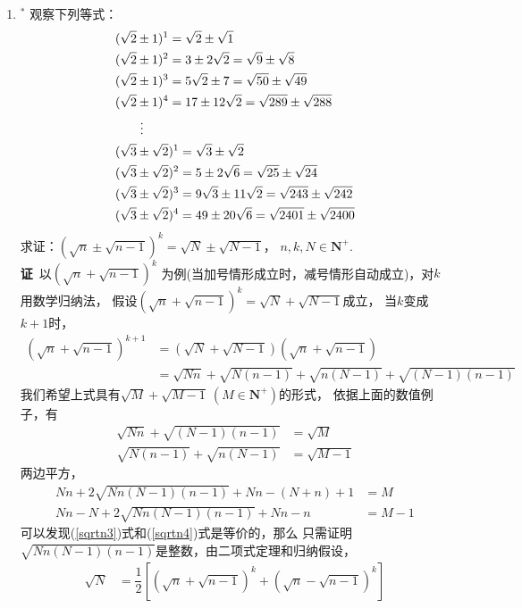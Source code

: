 \begin{enumerate}[label={【\textbf{例\thechapter.\arabic*}】},
 leftmargin=\inteval{\myenumleftmargin}pt,
 itemsep=\inteval{\myenumitempsep}pt,
 itemindent=\inteval{\myenumitemindent}pt]
\item $^*$ 观察下列等式：
\begin{align*}
    &(\sqrt{2} \pm 1)^{1}=\sqrt{2} \pm \sqrt{1} \\
    &(\sqrt{2} \pm 1)^{2}=3 \pm 2\sqrt{2}=\sqrt{9} \pm \sqrt{8} \\
    &(\sqrt{2} \pm 1)^{3}=5\sqrt{2} \pm 7=\sqrt{50} \pm \sqrt{49} \\
    &(\sqrt{2} \pm 1)^{4}=17 \pm 12\sqrt{2}=\sqrt{289} \pm \sqrt{288} \\
    & \quad\quad \vdots \\
    &(\sqrt{3} \pm \sqrt{2})^{1}=\sqrt{3} \pm \sqrt{2} \\
    &(\sqrt{3} \pm \sqrt{2})^{2}=5 \pm 2\sqrt{6}=\sqrt{25} \pm \sqrt{24} \\
    &(\sqrt{3} \pm \sqrt{2})^{3}=9\sqrt{3} \pm 11\sqrt{2}=\sqrt{243} \pm 
    \sqrt{242} \\
    &(\sqrt{3} \pm \sqrt{2})^{4}=49 \pm 20\sqrt{6}=\sqrt{2401} \pm \sqrt{2400}    
\end{align*}
求证：$ (\sqrt{n}\pm\sqrt{n-1})^k=\sqrt{N}\pm\sqrt{N-1} $，
$ n,k,N\in \textbf{N}^+ $. \\
\textbf{证}\ 以$ (\sqrt{n}+\sqrt{n-1})^{k} $
为例(当加号情形成立时，减号情形自动成立)，对$ k $用数学归纳法，
假设$ (\sqrt{n}+\sqrt{n-1})^k=\sqrt{N}+\sqrt{N-1} $成立，
当$ k $变成$ k+1 $时，
\begin{align*}
    (\sqrt{n}+\sqrt{n-1})^{k+1}&=(\sqrt{N}+\sqrt{N-1})(\sqrt{n}+\sqrt{n-1}) \\
    &=\sqrt{Nn}+\sqrt{N(n-1)}+\sqrt{n(N-1)}+\sqrt{(N-1)(n-1)}
\end{align*}
我们希望上式具有$ \sqrt{M}+\sqrt{M-1}\ (M\in \textbf{N}^+) $的形式，
依据上面的数值例子，有
\begin{align}
    \sqrt{Nn}+\sqrt{(N-1)(n-1)} &=\sqrt{M}   \label{sqrtn1} \\
    \sqrt{N(n-1)}+\sqrt{n(N-1)} &=\sqrt{M-1} \label{sqrtn2}
\end{align}
两边平方，
\begin{align}
    Nn+2\sqrt{Nn(N-1)(n-1)}+Nn-(N+n)+1 &=M   \label{sqrtn3} \\
    Nn-N+2\sqrt{Nn(N-1)(n-1)}+Nn-n     &=M-1 \label{sqrtn4}
\end{align}
可以发现(\ref{sqrtn3})式和(\ref{sqrtn4})式是等价的，那么
只需证明$ \sqrt{Nn(N-1)(n-1)} $是整数，由二项式定理和归纳假设，
\begin{align*}
    \sqrt{N} &=\dfrac{1}{2}\left[(\sqrt{n}+\sqrt{n-1})^k
    +(\sqrt{n}-\sqrt{n-1})^k\right] \\

\end{align*}
\end{enumerate}
